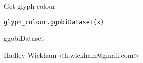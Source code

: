 \begin{Description}\relax
Get glyph colour
\end{Description}
\begin{Usage}
\begin{verbatim}glyph_colour.ggobiDataset(x)\end{verbatim}
\end{Usage}
\begin{Arguments}
\begin{ldescription}
\item[\code{x}] ggobiDataset
\end{ldescription}
\end{Arguments}
\begin{Details}\relax
\end{Details}
\begin{Author}\relax
Hadley Wickham <h.wickham@gmail.com>
\end{Author}
\begin{SeeAlso}\relax
{}
\end{SeeAlso}
\begin{Examples}
\begin{ExampleCode}\end{ExampleCode}
\end{Examples}

